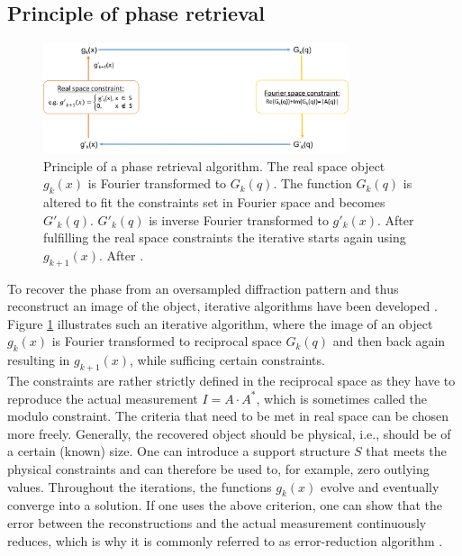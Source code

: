 \subsection{Principle of phase retrieval}\label{sec:phase-retrieval-fundamental}
\begin{figure}
	\centering
		\includegraphics[width=0.80\textwidth]{images/phase-retrieval-algorithm.png}
	\caption[Example of a phase retrieval algorithm.]{Principle of a phase retrieval algorithm. The real space object $g_{k}\left(x\right)$ is Fourier transformed to $G_{k}\left(q\right)$. The function $G_{k}\left(q\right)$ is altered to fit the constraints set in Fourier space and becomes $G'_{k}\left(q\right)$. $G'_{k}\left(q\right)$ is inverse Fourier transformed to $g'_{k}\left(x\right)$. After fulfilling the real space constraints the iterative starts again using $g_{k+1}\left(x\right)$. After \citep{Fienup-1982-AO}.}
	\label{fig:phase-retrieval-algorithm}
\end{figure}
To recover the phase from an oversampled diffraction pattern and thus reconstruct an image of the object, iterative algorithms have been developed \cite{Fienup-1982-AO}. Figure \ref{fig:phase-retrieval-algorithm} illustrates such an iterative algorithm, where the image of an object $g_{k}\left(x\right)$ is Fourier transformed to reciprocal space $G_{k}\left(q\right)$ and then back again resulting in $g_{k+1}(x)$, while sufficing certain constraints.\\[1\baselineskip]
%
The constraints are rather strictly defined in the reciprocal space as they have to reproduce the actual measurement $I=A\cdot A^{*}$, which is sometimes called the modulo constraint. The criteria that need to be met in real space can be chosen more freely. Generally, the recovered object should be physical, i.e., should be of a certain (known) size. One can introduce a support structure $S$ that meets the physical constraints and can therefore be used to, for example, zero outlying values. Throughout the iterations, the functions $g_{k}(x)$ evolve and eventually converge into a solution. If one uses the above criterion, one can show that the error between the reconstructions and the actual measurement continuously reduces, which is why it is commonly referred to as error-reduction algorithm \cite{Fienup-1978-OL}.
%
%
%
%
